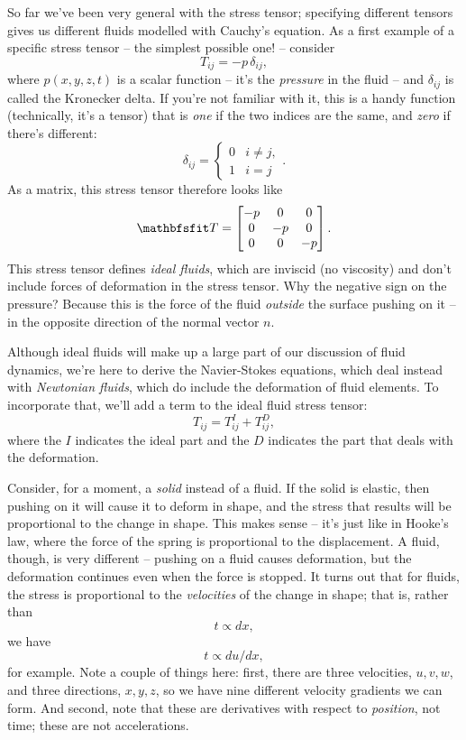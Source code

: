 So far we've been very general with the stress tensor; specifying different tensors gives us different fluids modelled with Cauchy's equation.  As a first example of a specific stress tensor -- the simplest possible one! -- consider 
\begin{equation}
T_{ij} = -p \, \delta_{ij},
\end{equation}
where $p(x, y, z, t)$ is a scalar function -- it's the \emph{pressure} in the fluid -- and $\delta_{ij}$ is called the Kronecker delta.  If you're not familiar with it, this is a handy function (technically, it's a tensor) that is \emph{one} if the two indices are the same, and \emph{zero} if there's different:
\[
\delta_{ij} = \begin{cases}
0 & i \neq j, \\
1 & i = j \end{cases}.
\]
As a matrix, this stress tensor therefore looks like
\begin{equation}
\tens{T} = \begin{bmatrix}
-p & 0 & 0 \\
0 & -p & 0 \\
0 & 0 & -p
\end{bmatrix}.
\label{eq_stress_ideal}
\end{equation}
This stress tensor defines \emph{ideal fluids}, which are inviscid (no viscosity) and don't include forces of deformation in the stress tensor.  Why the negative sign on the pressure?  Because this is the force of the fluid \emph{outside} the surface pushing on it -- in the opposite direction of the normal vector $\unit{n}$.

Although ideal fluids will make up a large part of our discussion of fluid dynamics, we're here to derive the Navier-Stokes equations, which deal instead with \emph{Newtonian fluids}, which do include the deformation of fluid elements.  To incorporate that, we'll add a term to the ideal fluid stress tensor:
\begin{equation}
T_{ij} = T_{ij}^I + T_{ij}^D,
\end{equation}
where the $I$ indicates the ideal part and the $D$ indicates the part that deals with the deformation.  

Consider, for a moment, a \emph{solid} instead of a fluid.  If the solid is elastic, then pushing on it will cause it to deform in shape, and the stress that results will be proportional to the change in shape.  This makes sense -- it's just like in Hooke's law, where the force of the spring is proportional to the displacement.  A fluid, though, is very different -- pushing on a fluid causes deformation, but the deformation continues even when the force is stopped.  It turns out that for fluids, the stress is proportional to the \emph{velocities} of the change in shape; that is, rather than
\[
t \propto dx,
\]
we have
\[
t \propto du/dx,
\]
for example.  Note a couple of things here:  first, there are three velocities, $u, v, w$, and three directions, $x, y, z$, so we have nine different velocity gradients we can form.  And second, note that these are derivatives with respect to \emph{position}, not time; these are not accelerations.

